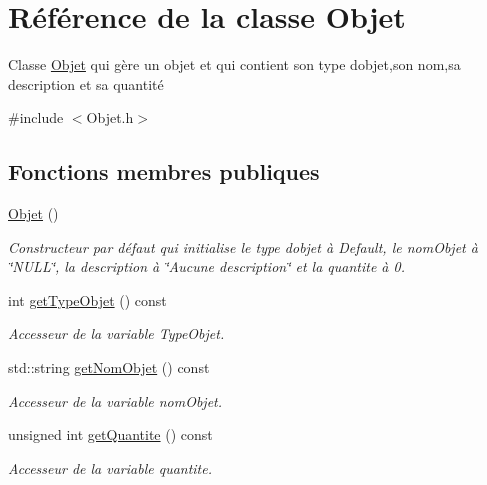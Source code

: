 \hypertarget{class_objet}{}\section{Référence de la classe Objet}
\label{class_objet}


Classe \hyperlink{class_objet}{Objet} qui gère un objet et qui contient son type d\textquotesingle{}objet,son nom,sa description et sa quantité  




{\ttfamily \#include $<$Objet.\+h$>$}

\subsection*{Fonctions membres publiques}
\begin{DoxyCompactItemize}
\item 
\mbox{\label{class_objet_aefdd826d50085897e4894ffef4597d04}} 
\hyperlink{class_objet_aefdd826d50085897e4894ffef4597d04}{Objet} ()
\begin{DoxyCompactList}\small\item\em Constructeur par défaut qui initialise le type d\textquotesingle{}objet à Default, le nom\+Objet à \char`\"{}\+N\+U\+L\+L\char`\"{}, la description à \char`\"{}\+Aucune description\char`\"{} et la quantite à 0. \end{DoxyCompactList}\item 
int \hyperlink{class_objet_ab75ba7bf1170582a4d50ba8848be2848}{get\+Type\+Objet} () const
\begin{DoxyCompactList}\small\item\em Accesseur de la variable Type\+Objet. \end{DoxyCompactList}\item 
std\+::string \hyperlink{class_objet_a29be0a2d83cdebac4fedd495e3824515}{get\+Nom\+Objet} () const
\begin{DoxyCompactList}\small\item\em Accesseur de la variable nom\+Objet. \end{DoxyCompactList}\item 
unsigned int \hyperlink{class_objet_a3352afeefcae6415b3c73112fd588ab5}{get\+Quantite} () const
\begin{DoxyCompactList}\small\item\em Accesseur de la variable quantite. \end{DoxyCompactList}\item 

\end{DoxyCompactItemize}
